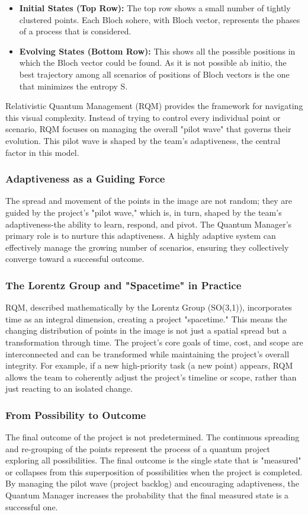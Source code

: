 \documentclass{article}
\begin{document}
\begin{itemize}
\item \textbf{Initial States (Top Row):} The top row shows a small number of tightly clustered points. Each Bloch sohere, with Bloch vector, represents the phases of a process that is considered.
\item \textbf{Evolving States (Bottom Row):} This shows all the possible positions in which the Bloch vector could be found. As it is not possible ab initio, the best trajectory among all scenarios of positions of Bloch vectors is the one that minimizes the entropy S.
\end{itemize}


Relativistic Quantum Management (RQM) provides the framework for navigating this visual complexity. Instead of trying to control every individual point or scenario, RQM focuses on managing the overall "pilot wave" that governs their evolution. This pilot wave is shaped by the team's adaptiveness, the central factor in this model.

\subsubsection*{Adaptiveness as a Guiding Force}
The spread and movement of the points in the image are not random; they are guided by the project's "pilot wave," which is, in turn, shaped by the team's adaptiveness-the ability to learn, respond, and pivot. The Quantum Manager's primary role is to nurture this adaptiveness. A highly adaptive system can effectively manage the growing number of scenarios, ensuring they collectively converge toward a successful outcome.

\subsubsection*{The Lorentz Group and "Spacetime" in Practice}
RQM, described mathematically by the Lorentz Group (SO(3,1)), incorporates time as an integral dimension, creating a project "spacetime." This means the changing distribution of points in the image is not just a spatial spread but a transformation through time. The project's core goals of time, cost, and scope are interconnected and can be transformed while maintaining the project's overall integrity. For example, if a new high-priority task (a new point) appears, RQM allows the team to coherently adjust the project's timeline or scope, rather than just reacting to an isolated change.

\subsubsection*{From Possibility to Outcome}
The final outcome of the project is not predetermined. The continuous spreading and re-grouping of the points represent the process of a quantum project exploring all possibilities. The final outcome is the single state that is "measured" or collapses from this superposition of possibilities when the project is completed. By managing the pilot wave (project backlog) and encouraging adaptiveness, the Quantum Manager increases the probability that the final measured state is a successful one.
\end{document}
